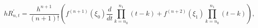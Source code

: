 \[hR^{\prime}_{n,t}=\frac{h^{n+1}}{(n+1)!}\left(f^{(n+1)}(\xi_{0})\frac{d}{dt}%
\prod_{k=n_{0}}^{n_{1}}(t-k)+f^{(n+2)}(\xi_{1})\prod_{k=n_{0}}^{n_{1}}(t-k)%
\right),\]